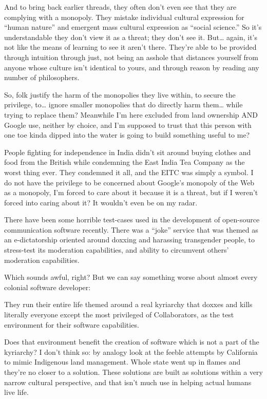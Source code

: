 \documentclass[11pt]{article}
\begin{document}
\begin{itemize}
And to bring back earlier threads, they often don’t even see that they are complying with a monopoly. They mistake individual cultural expression for “human nature” and emergent mass cultural expression as “social science.” So it’s understandable they don’t view it as a threat; they don’t see it. But… again, it’s not like the means of learning to see it aren’t there. They’re able to be provided through intuition through just, not being an asshole that distances yourself from anyone whose culture isn’t identical to yours, and through reason by reading any number of philosophers.

So, folk justify the harm of the monopolies they live within, to secure the privilege, to… ignore smaller monopolies that do directly harm them… while trying to replace them? Meanwhile I’m here excluded from land ownership AND Google use, neither by choice, and I’m supposed to trust that this person with one toe kinda dipped into the water is going to build something useful to me?

People fighting for independence in India didn’t sit around buying clothes and food from the British while condemning the East India Tea Company as the worst thing ever. They condemned it all, and the EITC was simply a symbol. I do not have the privilege to be concerned about Google’s monopoly of the Web as a monopoly, I’m forced to care about it because it is a threat, but if I weren’t forced into caring about it? It wouldn’t even be on my radar.

There have been some horrible test-cases used in the development of open-source communication software recently. There was a “joke” service that was themed as an e-dictatorship oriented around doxxing and harassing transgender people, to stress-test its moderation capabilities, and ability to circumvent others’ moderation capabilities.

Which sounds awful, right? But we can say something worse about almost every colonial software developer:

They run their entire life themed around a real kyriarchy that doxxes and kills literally everyone except the most privileged of Collaborators, as the test environment for their software capabilities.

Does that environment benefit the creation of software which is not a part of the kyriarchy? I don’t think so: by analogy look at the feeble attempts by California to mimic Indigenous land management. Whole state went up in flames and they’re no closer to a solution. These solutions are built as solutions within a very narrow cultural perspective, and that isn’t much use in helping actual humans live life.


\end{itemize}
\end{document}
